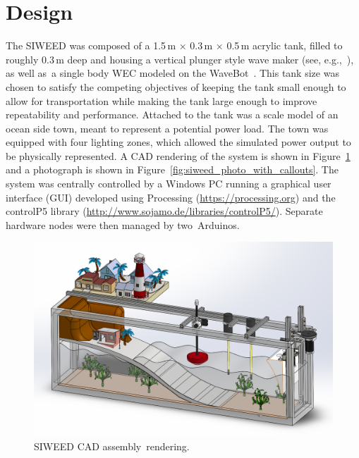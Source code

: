 \documentclass[hardware,article,submit,pdftex,moreauthors]{Definitions/mdpi}
\begin{document}
\section{Design} 
The SIWEED was composed of a 1.5\,m $\times{}$ 0.3\,m $\times{}$ 0.5\,m acrylic tank, filled to roughly 0.3\,m deep and housing a vertical plunger style wave maker (see, e.g.,~\cite{hyun1976simplified}), as well as~a single body WEC modeled on the WaveBot~\cite{Coe2016a}.
This tank size was chosen to satisfy the competing objectives of keeping the tank small enough to allow for transportation while making the tank large enough to improve repeatability and performance.
Attached to the tank was a scale model of an ocean side town, meant to represent a potential power load.
The town was equipped with four lighting zones, which allowed the simulated power output to be physically represented.
A CAD rendering of the system is shown in Figure~\ref{fig:CAD} and a photograph is shown in Figure~\ref{fig:siweed_photo_with_callouts}.
The system was centrally controlled by a Windows PC running a graphical user interface (GUI) developed using Processing (\url{https://processing.org}) and the controlP5 library (\url{http://www.sojamo.de/libraries/controlP5/}).
Separate hardware nodes were then managed by two~Arduinos.

\begin{figure}[H]
  
  \includegraphics[width=1\textwidth]{diagrams/SIWEED_CAD.png}
  \caption{SIWEED CAD assembly~rendering.}
  \label{fig:CAD}
\end{figure}
\unskip
\end{document}
